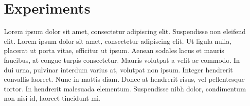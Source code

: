 \section{Experiments} \label{sec:experiments}
 Lorem ipsum dolor sit amet, consectetur adipiscing elit. Suspendisse non eleifend elit. Lorem ipsum dolor sit amet, consectetur adipiscing elit. Ut ligula nulla, placerat ut porta vitae, efficitur ut ipsum. Aenean sodales lacus et mauris faucibus, at congue turpis consectetur. Mauris volutpat a velit ac commodo. In dui urna, pulvinar interdum varius at, volutpat non ipsum. Integer hendrerit convallis laoreet. Nunc in mattis diam. Donec at hendrerit risus, vel pellentesque tortor. In hendrerit malesuada elementum. Suspendisse nibh dolor, condimentum non nisi id, laoreet tincidunt mi.
 

